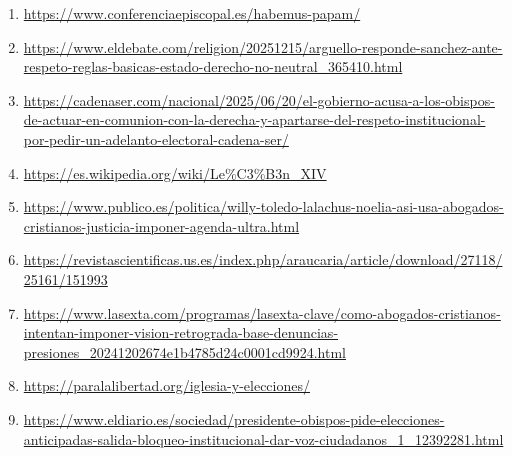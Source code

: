 \documentclass[10pt,a4paper]{article}
\begin{document}
\begin{enumerate}[leftmargin=*]
            \item \url{ https://www.conferenciaepiscopal.es/habemus-papam/ }
            \item \url{ https://www.eldebate.com/religion/20251215/arguello-responde-sanchez-ante-respeto-reglas-basicas-estado-derecho-no-neutral\_365410.html }
            \item \url{ https://cadenaser.com/nacional/2025/06/20/el-gobierno-acusa-a-los-obispos-de-actuar-en-comunion-con-la-derecha-y-apartarse-del-respeto-institucional-por-pedir-un-adelanto-electoral-cadena-ser/ }
            \item \url{ https://es.wikipedia.org/wiki/Le\%C3\%B3n\_XIV }
            \item \url{ https://www.publico.es/politica/willy-toledo-lalachus-noelia-asi-usa-abogados-cristianos-justicia-imponer-agenda-ultra.html }
            \item \url{ https://revistascientificas.us.es/index.php/araucaria/article/download/27118/25161/151993 }
            \item \url{ https://www.lasexta.com/programas/lasexta-clave/como-abogados-cristianos-intentan-imponer-vision-retrograda-base-denuncias-presiones\_20241202674e1b4785d24c0001cd9924.html }
            \item \url{ https://paralalibertad.org/iglesia-y-elecciones/ }
            \item \url{ https://www.eldiario.es/sociedad/presidente-obispos-pide-elecciones-anticipadas-salida-bloqueo-institucional-dar-voz-ciudadanos\_1\_12392281.html }
    \end{enumerate}
\vspace{1em}
\end{document}
